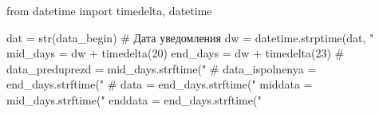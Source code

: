 \begin{pycode}	
from datetime import timedelta, datetime

dat = str(data_begin)   # Дата уведомления
dw = datetime.strptime(dat, "%
mid_days = dw + timedelta(20)
end_days = dw + timedelta(23)
# data_preduprezd = mid_days.strftime("%
# data_ispolnenya = end_days.strftime("%
# data = end_days.strftime("%
middata = mid_days.strftime("%
enddata = end_days.strftime("%
\end{pycode}
%
%
%
%
%
%
%
